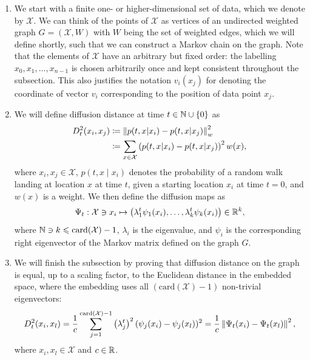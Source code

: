 \begin{enumerate}
    \renewcommand{\labelenumi}{(\Roman{enumi}).}
    \item We start with a finite one- or higher-dimensional set of data, which we denote by $\mathcal{X}$. We can think of the points of $\mathcal{X}$ as vertices of an undirected weighted graph $G=(\mathcal{X}, W)$ with $W$ being the set of weighted edges, which we will define shortly, such that we can construct a Markov chain on the graph. Note that the elements of $\mathcal{X}$ have an arbitrary but fixed order: the labelling $x_0, x_1, \dots, x_{n-1}$ is chosen arbitrarily once and kept consistent throughout the subsection. This also justifies the notation $v_i(x_j)$ for denoting the coordinate of vector $v_i$ corresponding to the position of data point $x_j$.

    \item We will define diffusion distance at time $t\in\mathbb{N}\cup\{0\}$ as 
    \begin{align*}
    D_t^2(x_i,x_j) & \coloneqq \left\lVert p(t,x|x_i) - p(t,x|x_j)\right\rVert_w^2 \\
    &\coloneqq \sum\limits_{x\in\mathcal{X}}\left( p(t,x|x_i)-p(t,x|x_j)\right)^2w(x),
    \end{align*}
    where $x_i,x_j\in\mathcal{X}$, $p(t,x\mid x_i)$ denotes the probability of a random walk landing at location $x$ at time $t$, given a starting location $x_i$ at time $t = 0$, and $w(x)$ is a weight. We then define the diffusion maps as
    \begin{align*}
        \Psi_t:\mathcal{X}\ni x_i\mapsto\left( \lambda_1^t\psi_1(x_i),\dots,\lambda_{k}^t\psi_{k}(x_i)\right)\in\mathbb{R}^{k},
    \end{align*}
    where $\mathbb{N}\ni k\leqslant \text{card}(\mathcal{X})-1$, $\lambda_i$ is the eigenvalue, and $\psi_i$ is the corresponding right eigenvector of the Markov matrix defined on the graph $G$.

    \item We will finish the subsection by proving that diffusion distance on the graph is equal, up to a scaling factor, to the Euclidean distance in the embedded space, where the embedding uses all $(\text{card}(\mathcal{X})-1)$ non-trivial eigenvectors:
    \begin{equation*}
        D_t^2(x_i,x_l) = \frac{1}{c} \sum_{j=1}^{\text{card}(\mathcal{X})-1}\left(\lambda_j^t\right)^2(\psi_j(x_i)-\psi_j(x_l))^2=\frac{1}{c}\left\lVert\Psi_t(x_i)-\Psi_t(x_l)\right\rVert^2,
    \end{equation*}
    where $x_i, x_l\in\mathcal{X}$ and $c\in\mathbb{R}$.
\end{enumerate}

